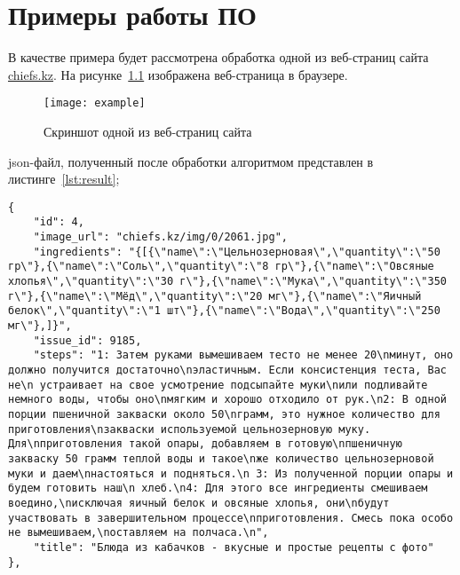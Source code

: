 \chapter{Примеры работы ПО}

В качестве примера будет рассмотрена обработка одной из веб-страниц сайта \url{chiefs.kz}. На рисунке~\ref{examplepage} изображена веб-страница в браузере.

\begin{figure}[h!]
    \texttt{[image: example]}
    \caption{Скриншот одной из веб-страниц сайта}
    \label{examplepage}
\end{figure}

json-файл, полученный после обработки алгоритмом представлен в листинге~\ref{lst:result};

\begin{lstlisting}[caption={json-файл, полученный после обработки рецепта},label={lst:result}]
{
    "id": 4,
    "image_url": "chiefs.kz/img/0/2061.jpg",
    "ingredients": "{[{\"name\":\"Цельнозерновая\",\"quantity\":\"50 гр\"},{\"name\":\"Соль\",\"quantity\":\"8 гр\"},{\"name\":\"Овсяные хлопья\",\"quantity\":\"30 г\"},{\"name\":\"Мука\",\"quantity\":\"350 г\"},{\"name\":\"Мёд\",\"quantity\":\"20 мг\"},{\"name\":\"Яичный белок\",\"quantity\":\"1 шт\"},{\"name\":\"Вода\",\"quantity\":\"250 мг\"},]}",
    "issue_id": 9185,
    "steps": "1: Затем руками вымешиваем тесто не менее 20\nминут, оно должно получится достаточно\nэластичным. Если консистенция теста, Вас не\n устраивает на свое усмотрение подсыпайте муки\nили подливайте немного воды, чтобы оно\nмягким и хорошо отходило от рук.\n2: В одной порции пшеничной закваски около 50\nграмм, это нужное количество для приготовления\nзакваски используемой цельнозерновую муку. Для\nприготовления такой опары, добавляем в готовую\nпшеничную закваску 50 грамм теплой воды и такое\nже количество цельнозерновой муки и даем\nнастояться и подняться.\n 3: Из полученной порции опары и будем готовить наш\n хлеб.\n4: Для этого все ингредиенты смешиваем воедино,\nисключая яичный белок и овсяные хлопья, они\nбудут участвовать в завершительном процессе\nприготовления. Смесь пока особо не вымешиваем,\nоставляем на полчаса.\n",
    "title": "Блюда из кабачков - вкусные и простые рецепты с фото"
},
\end{lstlisting}
